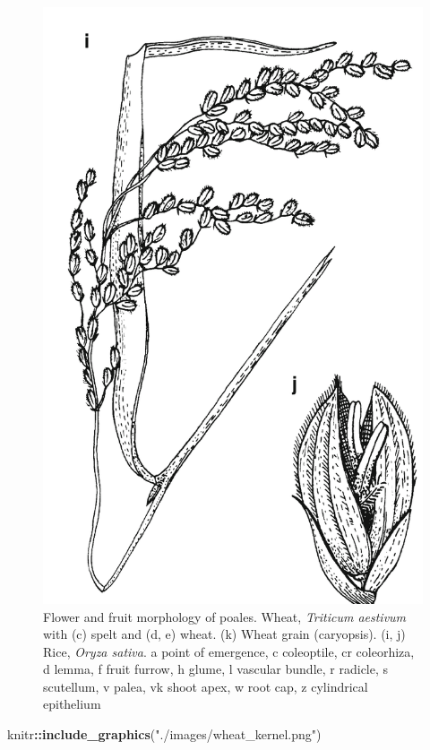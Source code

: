 \documentclass[]{article}
\newenvironment{Shaded}{\begin{snugshade}}{\end{snugshade}}
\newcommand{\KeywordTok}[1]{\textcolor[rgb]{0.13,0.29,0.53}{\textbf{#1}}}
\newcommand{\NormalTok}[1]{#1}
\newcommand{\OperatorTok}[1]{\textcolor[rgb]{0.81,0.36,0.00}{\textbf{#1}}}
\newcommand{\StringTok}[1]{\textcolor[rgb]{0.31,0.60,0.02}{#1}}
\begin{document}
\begin{figure}

{\centering \includegraphics[width=0.8\linewidth]{./images/rice_panicle} 

}

\caption{Flower and fruit morphology of poales. Wheat, \textit{Triticum aestivum} with (c) spelt and (d, e) wheat. (k) Wheat grain (caryopsis). (i, j) Rice, \textit{Oryza sativa}. a point of emergence, c coleoptile, cr coleorhiza, d lemma, f fruit furrow, h glume, l vascular bundle, r radicle, s scutellum, v palea, vk shoot apex, w root cap, z cylindrical epithelium}\label{fig:floral-morphology-poales}
\end{figure}

\begin{Shaded}
\begin{Highlighting}[]
\NormalTok{knitr}\OperatorTok{::}\KeywordTok{include_graphics}\NormalTok{(}\StringTok{"./images/wheat_kernel.png"}\NormalTok{)}
\end{Highlighting}
\end{Shaded}
\end{document}

